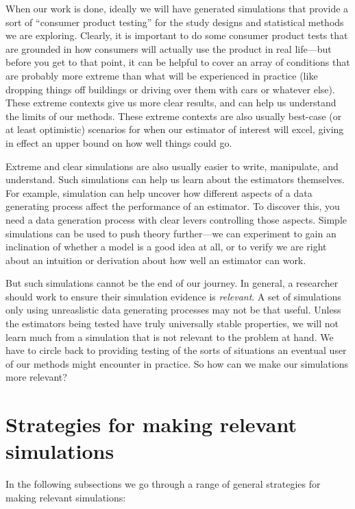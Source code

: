 \documentclass[
]{book}
\begin{document}
When our work is done, ideally we will have generated simulations that provide a sort of ``consumer product testing'' for the study designs and statistical methods we are exploring.
Clearly, it is important to do some consumer product tests that are grounded in how consumers will actually use the product in real life---but before you get to that point, it can be helpful to cover an array of conditions that are probably more extreme than what will be experienced in practice (like dropping things off buildings or driving over them with cars or whatever else).
These extreme contexts give us more clear results, and can help us understand the limits of our methods.
These extreme contexts are also usually best-case (or at least optimistic) scenarios for when our estimator of interest will excel, giving in effect an upper bound on how well things could go.

Extreme and clear simulations are also usually easier to write, manipulate, and understand.
Such simulations can help us learn about the estimators themselves.
For example, simulation can help uncover how different aspects of a data generating process affect the performance of an estimator.
To discover this, you need a data generation process with clear levers controlling those aspects.
Simple simulations can be used to push theory further---we can experiment to gain an inclination of whether a model is a good idea at all, or to verify we are right about an intuition or derivation about how well an estimator can work.

But such simulations cannot be the end of our journey.
In general, a researcher should work to ensure their simulation evidence is \emph{relevant}.
A set of simulations only using unreaslistic data generating processes may not be that useful.
Unless the estimators being tested have truly universally stable properties, we will not learn much from a simulation that is not relevant to the problem at hand.
We have to circle back to providing testing of the sorts of situations an eventual user of our methods might encounter in practice.
So how can we make our simulations more relevant?

\section{Strategies for making relevant simulations}\label{strategies-for-making-relevant-simulations}

In the following subsections we go through a range of general strategies for making relevant simulations:
\end{document}
